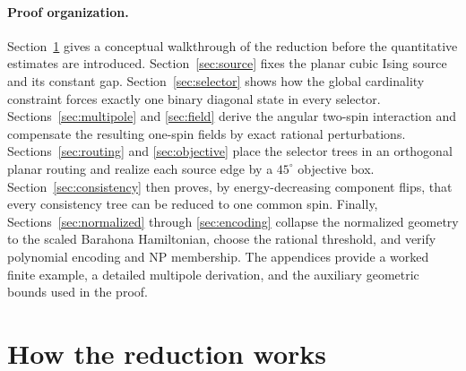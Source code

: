 \documentclass[12pt,a4paper]{article}
\begin{document}

\paragraph{Proof organization.}
Section~\ref{sec:walkthrough} gives a conceptual walkthrough of the reduction before the quantitative estimates are introduced.  Section~\ref{sec:source} fixes the planar cubic Ising source and its constant gap.  Section~\ref{sec:selector} shows how the global cardinality constraint forces exactly one binary diagonal state in every selector.  Sections~\ref{sec:multipole} and \ref{sec:field} derive the angular two-spin interaction and compensate the resulting one-spin fields by exact rational perturbations.  Sections~\ref{sec:routing} and \ref{sec:objective} place the selector trees in an orthogonal planar routing and realize each source edge by a $45^\circ$ objective box.  Section~\ref{sec:consistency} then proves, by energy-decreasing component flips, that every consistency tree can be reduced to one common spin.  Finally, Sections~\ref{sec:normalized} through \ref{sec:encoding} collapse the normalized geometry to the scaled Barahona Hamiltonian, choose the rational threshold, and verify polynomial encoding and NP membership.  The appendices provide a worked finite example, a detailed multipole derivation, and the auxiliary geometric bounds used in the proof.

\section{How the reduction works}\label{sec:walkthrough}
\end{document}
